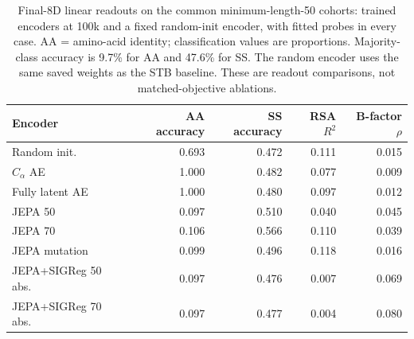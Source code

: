 \begin{table}[htbp]
\centering
\resultstableformat
\begin{tabular}{lrrrr}
\toprule
Encoder & AA accuracy & SS accuracy & RSA $R^2$ & B-factor $\rho$ \\
\midrule
Random init. & 0.693 & 0.472 & 0.111 & 0.015 \\
$C_\alpha$ AE & 1.000 & 0.482 & 0.077 & 0.009 \\
Fully latent AE & 1.000 & 0.480 & 0.097 & 0.012 \\
JEPA 50 & 0.097 & 0.510 & 0.040 & 0.045 \\
JEPA 70 & 0.106 & 0.566 & 0.110 & 0.039 \\
JEPA mutation & 0.099 & 0.496 & 0.118 & 0.016 \\
JEPA+SIGReg 50 abs. & 0.097 & 0.476 & 0.007 & 0.069 \\
JEPA+SIGReg 70 abs. & 0.097 & 0.477 & 0.004 & 0.080 \\
\bottomrule
\end{tabular}
\caption{Final-8D linear readouts on the common minimum-length-50 cohorts: trained encoders at 100k and a fixed random-init encoder, with fitted probes in every case. AA = amino-acid identity; classification values are proportions. Majority-class accuracy is 9.7\% for AA and 47.6\% for SS. The random encoder uses the same saved weights as the STB baseline. These are readout comparisons, not matched-objective ablations.}
\label{tab:results-residue-probes}
\end{table}

